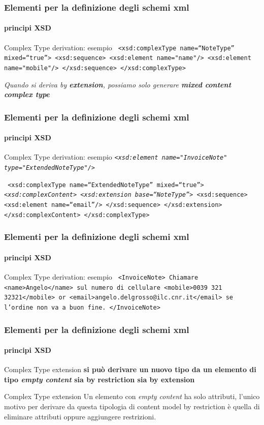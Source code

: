 \begin{frame}
	\frametitle{Elementi per la definizione degli schemi xml}
	\framesubtitle{principi XSD}
	\addtocounter{nframe}{1}

	\begin{block}{Complex Type derivation: esempio}
		\texttt{
			<xsd:complexType name=``NoteType'' mixed=``true''>
			<xsd:sequence>
			<xsd:element name="name"/>
			<xsd:element name="mobile"/>
			</xsd:sequence>
			</xsd:complexType>
		}
	\end{block}
	\textit{Quando si deriva by \textbf{extension}, possiamo solo generare \textbf{mixed content complex type}}
\end{frame}


\begin{frame}
	\frametitle{Elementi per la definizione degli schemi xml}
	\framesubtitle{principi XSD}
	\addtocounter{nframe}{1}

	\begin{block}{Complex Type derivation: esempio}
		\texttt{\emph{<xsd:element name="InvoiceNote" type="ExtendedNoteType"/>}}


		\texttt{
			<xsd:complexType name=``ExtendedNoteType'' mixed=``true''>
			\emph{<xsd:complexContent>}
			\emph{<xsd:extension base=``NoteType''>}
			<xsd:sequence>
			<xsd:element name=``email''/>
			</xsd:sequence>
			</xsd:extension>
			</xsd:complexContent>
			</xsd:complexType>
		}
	\end{block}
\end{frame}

\begin{frame}
	\frametitle{Elementi per la definizione degli schemi xml}
	\framesubtitle{principi XSD}
	\addtocounter{nframe}{1}

	\begin{block}{Complex Type derivation: esempio}
		\texttt{
			<InvoiceNote>
			Chiamare <name>Angelo</name> sul numero di cellulare <mobile>0039 321 32321</mobile> or <email>angelo.delgrosso@ilc.cnr.it</email> se l'ordine non va a buon fine.
			</InvoiceNote>
		}
	\end{block}
\end{frame}

\begin{frame}
	\frametitle{Elementi per la definizione degli schemi xml}
	\framesubtitle{principi XSD}
	\addtocounter{nframe}{1}

	\begin{block}{Complex Type extension}
		\textbf{si può derivare un nuovo tipo da un elemento di tipo \textit{empty content} sia by restriction sia by extension}
	\end{block}

	\begin{block}{Complex Type extension}
		Un elemento con \textit{empty content} ha solo attributi, l'unico motivo per derivare da questa tipologia di content model by restriction è quella di eliminare attributi oppure aggiungere restrizioni.
	\end{block}
\end{frame}



